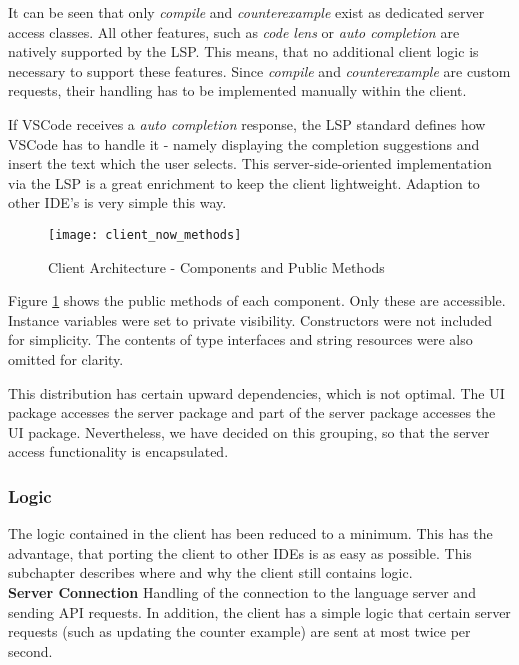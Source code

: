 It can be seen that only \textit{compile} and \textit{counterexample} exist as dedicated server access classes.
All other features, such as \textit{code lens} or \textit{auto completion} are natively supported by the LSP.
This means, that no additional client logic is necessary to support these features.
Since \textit{compile} and \textit{counterexample} are custom requests, their handling has to be implemented manually within the client.

If VSCode receives a \textit{auto completion} response, the LSP standard defines how VSCode has to handle it -
namely displaying the completion suggestions and insert the text which the user selects.
This server-side-oriented implementation via the LSP is a great enrichment to keep the client lightweight.
Adaption to other IDE's is very simple this way.

\begin{figure}[H]
    \centering
    \texttt{[image: client\_now\_methods]}
    \caption{Client Architecture - Components and Public Methods}
    \label{fig:client_now_methods}
\end{figure}

Figure \ref{fig:client_now_methods} shows the public methods of each component.
Only these are accessible.
Instance variables were set to private visibility.
Constructors were not included for simplicity.
The contents of type interfaces and string resources were also omitted for clarity.

This distribution has certain upward dependencies, which is not optimal.
The UI package accesses the server package and part of the server package accesses the UI package.
Nevertheless, we have decided on this grouping,
so that the server access functionality is encapsulated.

\subsubsection{Logic}
The logic contained in the client has been reduced to a minimum.
This has the advantage, that porting the client to other IDEs is as easy as possible.
This subchapter describes where and why the client still contains logic.\\

{\bf Server Connection} \textendash{}
Handling of the connection to the language server and sending API requests.
In addition, the client has a simple logic that certain server requests (such as updating the counter example) are sent at most twice per second. \\

